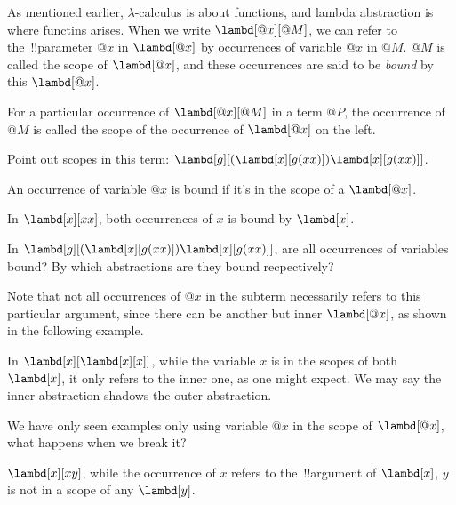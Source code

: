\documentclass[../../../include/open-logic-section]{subfiles}
\begin{document}

As mentioned earlier, $\lambda$-calculus is about functions, and
lambda abstraction is where functins arises. When we
write $\lambd[@x][@M]$, we can refer to the~!!{parameter} $@x$ in $\lambd[@x]$ by
occurrences of variable $@x$ in $@M$. $@M$ is called the
scope of $\lambd[@x]$, and these occurrences are said to be \emph{bound} by this
$\lambd[@x]$. 

\begin{defn}[Scope]
For a particular occurrence of $\lambd[@x][@M]$ in a term $@P$, the
occurrence of $@M$ is called the scope of the occurrence of $\lambd[@x]$
on the left.
\end{defn}

\begin{prob}
  Point out scopes in this term: $\lambd[g][(\lambd[x][g (x x)]) \lambd[x][g (x x)]]$.
\end{prob}

\begin{defn}
  An occurrence of variable $@x$ is bound if it's in the scope of a $\lambd[@x]$.
\end{defn}

\begin{ex}
  In $\lambd[x][x x]$, both occurrences of $x$ is bound by $\lambd[x]$.
\end{ex}

\begin{prob}
  In $\lambd[g][(\lambd[x][g (x x)]) \lambd[x][g (x x)]]$, are all
  occurrences of variables bound? By which abstractions are they
  bound recpectively?
\end{prob}

Note that not all occurrences of $@x$ in the subterm necessarily refers to this particular argument,
since there can be another but inner $\lambd[@x]$, as shown in the
following example. 
\begin{ex}
In $\lambd[x][\lambd[x][x]]$, while the variable $x$ is in the
scopes of both $\lambd[x]$, it only refers to the inner one, as one
might expect. We may say the inner abstraction shadows the outer
abstraction.
\end{ex}

We have only seen examples only using variable $@x$ in the scope of $\lambd[@x]$, 
what happens when we break it?
\begin{ex}
  $\lambd[x][x y]$, while the occurrence of $x$ refers to the~!!{argument} of $\lambd[x]$, $y$ is not in a scope
  of any $\lambd[y]$. 
\end{ex}
\end{document}
